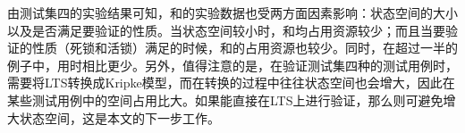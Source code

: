 由测试集四的实验结果可知，\sctlprov{}和\CADP{}的实验数据也受两方面因素影响：状态空间的大小以及是否满足要验证的性质。当状态空间较小时，\sctlprov{}和\CADP{}均占用资源较少；而且当要验证的性质（死锁和活锁）满足的时候，\sctlprov{}和\CADP{}的占用资源也较少。同时，在超过一半的例子中，\sctlprov{}用时相比\CADP{}更少。另外，值得注意的是，在验证测试集四种的测试用例时，\sctlprov{}需要将\textsf{LTS}转换成Kripke模型，而在转换的过程中往往状态空间也会增大，因此在某些测试用例中\sctlprov{}的空间占用比\CADP{}大。如果\sctlprov{}能直接在\textsf{LTS}上进行验证，那么则可避免增大状态空间，这是本文的下一步工作。

